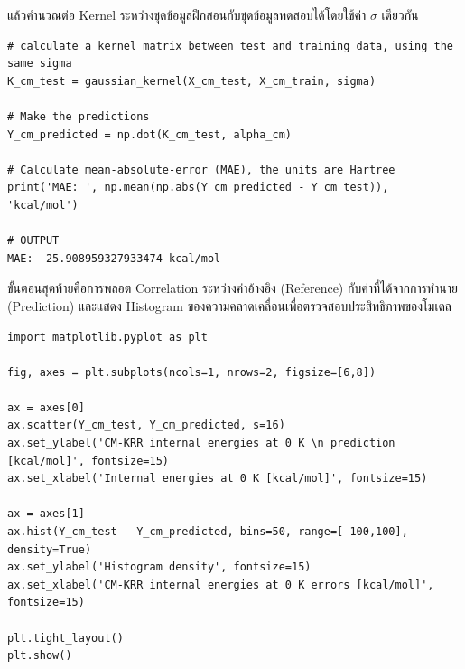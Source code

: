 \noindent แล้วคำนวณต่อ Kernel ระหว่างชุดข้อมูลฝึกสอนกับชุดข้อมูลทดสอบได้โดยใช้ค่า $\sigma$ เดียวกัน

\begin{lstlisting}[style=MyPython]
# calculate a kernel matrix between test and training data, using the same sigma
K_cm_test = gaussian_kernel(X_cm_test, X_cm_train, sigma)

# Make the predictions
Y_cm_predicted = np.dot(K_cm_test, alpha_cm)

# Calculate mean-absolute-error (MAE), the units are Hartree
print('MAE: ', np.mean(np.abs(Y_cm_predicted - Y_cm_test)), 'kcal/mol')

# OUTPUT
MAE:  25.908959327933474 kcal/mol
\end{lstlisting}

ขั้นตอนสุดท้ายคือการพลอต Correlation ระหว่างค่าอ้างอิง (Reference) กับค่าที่ได้จากการทำนาย (Prediction) และแสดง Histogram 
ของความคลาดเคลื่อนเพื่อตรวจสอบประสิทธิภาพของโมเดล

\begin{lstlisting}[style=MyPython]
import matplotlib.pyplot as plt

fig, axes = plt.subplots(ncols=1, nrows=2, figsize=[6,8])

ax = axes[0]
ax.scatter(Y_cm_test, Y_cm_predicted, s=16)
ax.set_ylabel('CM-KRR internal energies at 0 K \n prediction [kcal/mol]', fontsize=15)
ax.set_xlabel('Internal energies at 0 K [kcal/mol]', fontsize=15)

ax = axes[1]
ax.hist(Y_cm_test - Y_cm_predicted, bins=50, range=[-100,100], density=True)
ax.set_ylabel('Histogram density', fontsize=15)
ax.set_xlabel('CM-KRR internal energies at 0 K errors [kcal/mol]', fontsize=15)

plt.tight_layout()
plt.show()
\end{lstlisting}

